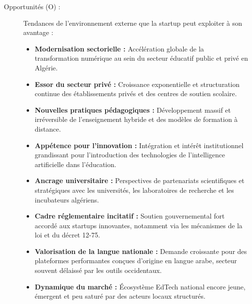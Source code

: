 \documentclass[12pt,a4paper,oneside]{report}
\begin{document}
\begin{description}
    \item[Opportunités (O) :] Tendances de l'environnement externe que la startup peut exploiter à son avantage :
    \begin{itemize}
        \item \textbf{Modernisation sectorielle :} Accélération globale de la transformation numérique au sein du secteur éducatif public et privé en Algérie.
        \item \textbf{Essor du secteur privé :} Croissance exponentielle et structuration continue des établissements privés et des centres de soutien scolaire.
        \item \textbf{Nouvelles pratiques pédagogiques :} Développement massif et irréversible de l'enseignement hybride et des modèles de formation à distance.
        \item \textbf{Appétence pour l'innovation :} Intégration et intérêt institutionnel grandissant pour l'introduction des technologies de l'intelligence artificielle dans l'éducation.
        \item \textbf{Ancrage universitaire :} Perspectives de partenariats scientifiques et stratégiques avec les universités, les laboratoires de recherche et les incubateurs algériens.
        \item \textbf{Cadre réglementaire incitatif :} Soutien gouvernemental fort accordé aux startups innovantes, notamment via les mécanismes de la loi et du décret 12-75.
        \item \textbf{Valorisation de la langue nationale :} Demande croissante pour des plateformes performantes conçues d'origine en langue arabe, secteur souvent délaissé par les outils occidentaux.
        \item \textbf{Dynamique du marché :} Écosystème EdTech national encore jeune, émergent et peu saturé par des acteurs locaux structurés.
    \end{itemize}


\end{description}
\end{document}
